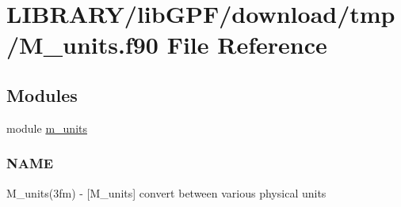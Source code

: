 \hypertarget{M__units_8f90}{}\section{L\+I\+B\+R\+A\+R\+Y/lib\+G\+P\+F/download/tmp/\+M\+\_\+units.f90 File Reference}
\label{M__units_8f90}
\subsection*{Modules}
\begin{DoxyCompactItemize}
\item 
module \hyperlink{namespacem__units}{m\+\_\+units}
\begin{DoxyCompactList}\small\item\em \subsubsection*{N\+A\+ME}

M\+\_\+units(3fm) -\/ \mbox{[}M\+\_\+units\mbox{]} convert between various physical units \end{DoxyCompactList}\end{DoxyCompactItemize}

